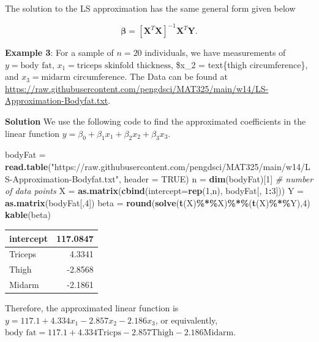 \documentclass[
]{book}
\newenvironment{Shaded}{\begin{snugshade}}{\end{snugshade}}
\newcommand{\AttributeTok}[1]{\textcolor[rgb]{0.13,0.29,0.53}{#1}}
\newcommand{\CommentTok}[1]{\textcolor[rgb]{0.56,0.35,0.01}{\textit{#1}}}
\newcommand{\ConstantTok}[1]{\textcolor[rgb]{0.56,0.35,0.01}{#1}}
\newcommand{\DecValTok}[1]{\textcolor[rgb]{0.00,0.00,0.81}{#1}}
\newcommand{\FunctionTok}[1]{\textcolor[rgb]{0.13,0.29,0.53}{\textbf{#1}}}
\newcommand{\NormalTok}[1]{#1}
\newcommand{\OtherTok}[1]{\textcolor[rgb]{0.56,0.35,0.01}{#1}}
\newcommand{\SpecialCharTok}[1]{\textcolor[rgb]{0.81,0.36,0.00}{\textbf{#1}}}
\newcommand{\StringTok}[1]{\textcolor[rgb]{0.31,0.60,0.02}{#1}}
\begin{document}
The solution to the LS approximation has the same general form given below

\[
\mathbf{\beta} = [\mathbf{X}^T \mathbf{X}]^{-1} \mathbf{X}^T\mathbf{Y}.
\]

\textbf{Example 3}: For a sample of \(n = 20\) individuals, we have measurements of \(y = \text{body fat}\), \(x_1 = \text{triceps skinfold thickness}\), \$x\_2 = text\{thigh circumference\}, and \(x_3 = \text{midarm circumference}\). The Data can be found at \url{https://raw.githubusercontent.com/pengdsci/MAT325/main/w14/LS-Approximation-Bodyfat.txt}.

\textbf{Solution} We use the following code to find the approximated coefficients in the linear function \(y = \beta_0 + \beta_1 x_1 + \beta_2 x_2 + \beta_3 x_3\).

\begin{Shaded}
\begin{Highlighting}[]
\NormalTok{bodyFat }\OtherTok{=} \FunctionTok{read.table}\NormalTok{(}\StringTok{"https://raw.githubusercontent.com/pengdsci/MAT325/main/w14/LS{-}Approximation{-}Bodyfat.txt"}\NormalTok{, }\AttributeTok{header =} \ConstantTok{TRUE}\NormalTok{)}
\NormalTok{n }\OtherTok{=} \FunctionTok{dim}\NormalTok{(bodyFat)[}\DecValTok{1}\NormalTok{]   }\CommentTok{\# number of data points}
\NormalTok{X }\OtherTok{=} \FunctionTok{as.matrix}\NormalTok{(}\FunctionTok{cbind}\NormalTok{(}\AttributeTok{intercept=}\FunctionTok{rep}\NormalTok{(}\DecValTok{1}\NormalTok{,n), bodyFat[, }\DecValTok{1}\SpecialCharTok{:}\DecValTok{3}\NormalTok{]))}
\NormalTok{Y }\OtherTok{=} \FunctionTok{as.matrix}\NormalTok{(bodyFat[,}\DecValTok{4}\NormalTok{])}
\NormalTok{beta }\OtherTok{=} \FunctionTok{round}\NormalTok{(}\FunctionTok{solve}\NormalTok{(}\FunctionTok{t}\NormalTok{(X)}\SpecialCharTok{\%*\%}\NormalTok{X)}\SpecialCharTok{\%*\%}\NormalTok{(}\FunctionTok{t}\NormalTok{(X)}\SpecialCharTok{\%*\%}\NormalTok{Y),}\DecValTok{4}\NormalTok{)}
\FunctionTok{kable}\NormalTok{(beta)}
\end{Highlighting}
\end{Shaded}

\begin{tabular}{l|r}
\hline
intercept & 117.0847\\
\hline
Triceps & 4.3341\\
\hline
Thigh & -2.8568\\
\hline
Midarm & -2.1861\\
\hline
\end{tabular}

Therefore, the approximated linear function is \(y = 117.1 + 4.334x_1 - 2.857 x_2 - 2.186 x_3\), or equivalently, \(\text{body fat} = 117.1 + 4.334\text{Tricps} - 2.857 \text{Thigh} - 2.186 \text{Midarm}\).
\end{document}
